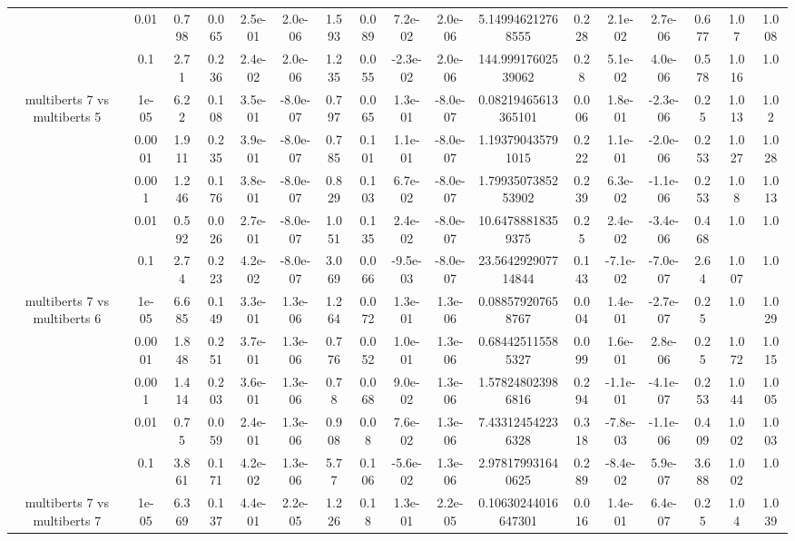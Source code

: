 \begin{tabular}{|c|c|c|c|c|c|c|c|c|c|c|c|c|c|c|c|c|}
 & 0.01 & 0.798 & 0.065 & 2.5e-01 & 2.0e-06 & 1.593 & 0.089 & 7.2e-02 & 2.0e-06 & 5.149946212768555 & 0.228 & 2.1e-02 & 2.7e-06 & 0.677 & 1.07 & 1.008 \\
 & 0.1 & 2.71 & 0.236 & 2.4e-02 & 2.0e-06 & 1.235 & 0.055 & -2.3e-02 & 2.0e-06 & 144.99917602539062 & 0.28 & 5.1e-02 & 4.0e-06 & 0.578 & 1.016 & 1.0 \\
\hline
\multirow{5}{*}{multiberts 7 vs multiberts 5} & 1e-05 & 6.22 & 0.108 & 3.5e-01 & -8.0e-07 & 0.797 & 0.065 & 1.3e-01 & -8.0e-07 & 0.08219465613365101 & 0.006 & 1.8e-01 & -2.3e-06 & 0.25 & 1.013 & 1.02 \\
 & 0.0001 & 1.911 & 0.235 & 3.9e-01 & -8.0e-07 & 0.785 & 0.101 & 1.1e-01 & -8.0e-07 & 1.193790435791015 & 0.222 & 1.1e-01 & -2.0e-06 & 0.253 & 1.027 & 1.028 \\
 & 0.001 & 1.246 & 0.176 & 3.8e-01 & -8.0e-07 & 0.829 & 0.103 & 6.7e-02 & -8.0e-07 & 1.7993507385253902 & 0.239 & 6.3e-02 & -1.1e-06 & 0.253 & 1.08 & 1.013 \\
 & 0.01 & 0.592 & 0.026 & 2.7e-01 & -8.0e-07 & 1.051 & 0.135 & 2.4e-02 & -8.0e-07 & 10.64788818359375 & 0.25 & 2.4e-02 & -3.4e-06 & 0.468 & 1.0 & 1.0 \\
 & 0.1 & 2.74 & 0.223 & 4.2e-02 & -8.0e-07 & 3.069 & 0.066 & -9.5e-03 & -8.0e-07 & 23.564292907714844 & 0.143 & -7.1e-02 & -7.0e-07 & 2.64 & 1.007 & 1.0 \\
\hline
\multirow{5}{*}{multiberts 7 vs multiberts 6} & 1e-05 & 6.685 & 0.149 & 3.3e-01 & 1.3e-06 & 1.264 & 0.072 & 1.3e-01 & 1.3e-06 & 0.088579207658767 & 0.004 & 1.4e-01 & -2.7e-07 & 0.25 & 1.0 & 1.029 \\
 & 0.0001 & 1.848 & 0.251 & 3.7e-01 & 1.3e-06 & 0.776 & 0.052 & 1.0e-01 & 1.3e-06 & 0.684425115585327 & 0.099 & 1.6e-01 & 2.8e-06 & 0.25 & 1.072 & 1.015 \\
 & 0.001 & 1.414 & 0.203 & 3.6e-01 & 1.3e-06 & 0.78 & 0.068 & 9.0e-02 & 1.3e-06 & 1.578248023986816 & 0.294 & -1.1e-01 & -4.1e-07 & 0.253 & 1.044 & 1.005 \\
 & 0.01 & 0.75 & 0.059 & 2.4e-01 & 1.3e-06 & 0.908 & 0.08 & 7.6e-02 & 1.3e-06 & 7.433124542236328 & 0.318 & -7.8e-03 & -1.1e-06 & 0.409 & 1.002 & 1.003 \\
 & 0.1 & 3.861 & 0.171 & 4.2e-02 & 1.3e-06 & 5.77 & 0.106 & -5.6e-02 & 1.3e-06 & 2.978179931640625 & 0.289 & -8.4e-02 & 5.9e-07 & 3.688 & 1.002 & 1.0 \\
\hline
\multirow{5}{*}{multiberts 7 vs multiberts 7} & 1e-05 & 6.369 & 0.137 & 4.4e-01 & 2.2e-05 & 1.226 & 0.18 & 1.3e-01 & 2.2e-05 & 0.10630244016647301 & 0.016 & 1.4e-01 & 6.4e-07 & 0.25 & 1.04 & 1.039 \\

\end{tabular}
